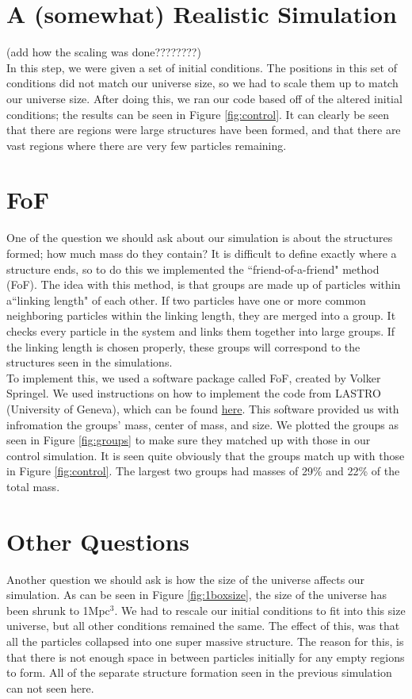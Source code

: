 \documentclass[10pt]{article}
\begin{document}
\section{A (somewhat) Realistic Simulation}
(add how the scaling was done????????)\\ 
	In this step, we were given a set of initial conditions. The positions in this set of conditions did not match our universe size, so we had to scale them up to match our universe size. After doing this, we ran our code based off of the altered initial conditions; the results can be seen in Figure \ref{fig:control}{}. It can clearly be seen that there are regions were large structures have been formed, and that there are vast regions where there are very few particles remaining.
	
	
\section{FoF}
	One of the question we should ask about our simulation is about the structures formed; how much mass do they contain? It is difficult to define exactly where a structure ends, so to do this we implemented the ``friend-of-a-friend" method (FoF). The idea with this method, is that groups are made up of particles within a``linking length" of each other. If two particles have one or more common neighboring particles within the linking length, they are merged into a group. It checks every particle in the system and links them together into large groups. If the linking length is chosen properly, these groups will correspond to the structures seen in the simulations.\\
	To implement this, we used a software package called FoF, created by Volker Springel. We used instructions on how to implement the code from LASTRO (University of Geneva), which can be found \href{http://obswww.unige.ch/lastro/misc/TP4/doc/rst/Exercices/Ex05.html#extracting-haloes}{here}. This software provided us with infromation the groups' mass, center of mass, and size. We plotted the groups as seen in Figure \ref{fig:groups}{} to make sure they matched up with those in our control simulation. It is seen quite obviously that the groups match up with those in Figure \ref{fig:control}. The largest two groups had masses of 29\% and 22\% of the total mass.


\section{Other Questions}
	Another question we should ask is how the size of the universe affects our simulation. As can be seen in Figure \ref{fig:1boxsize}{}, the size of the universe has been shrunk to 1Mpc$^3$. We had to rescale our initial conditions to fit into this size universe, but all other conditions remained the same. The effect of this, was that all the particles collapsed into one super massive structure. The reason for this, is that there is not enough space in between particles initially for any empty regions to form. All of the separate structure formation seen in the previous simulation can not seen here.
\end{document}
